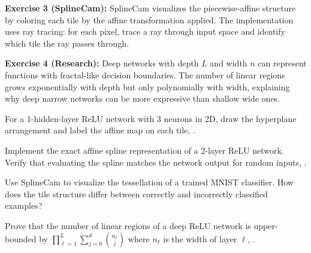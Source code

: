 \begin{solution}
\textbf{Exercise 3 (SplineCam):} SplineCam visualizes the piecewise-affine structure by coloring each tile by the affine transformation applied. The implementation uses ray tracing: for each pixel, trace a ray through input space and identify which tile the ray passes through.
\end{solution}

\begin{solution}
\textbf{Exercise 4 (Research):} Deep networks with depth $L$ and width $n$ can represent functions with fractal-like decision boundaries. The number of linear regions grows exponentially with depth but only polynomially with width, explaining why deep narrow networks can be more expressive than shallow wide ones.
\end{solution}

\label{sec:dl:exercises}

\begin{exercise}
For a 1-hidden-layer ReLU network with 3 neurons in 2D, draw the hyperplane arrangement and label the affine map on each tile, \cite{balestriero2025geometry}.
\end{exercise}

\begin{exercise}
Implement the exact affine spline representation of a 2-layer ReLU network. Verify that evaluating the spline matches the network output for random inputs, \cite{balestriero2025geometry}.
\end{exercise}

\begin{exercise}
Use SplineCam to visualize the tessellation of a trained MNIST classifier. How does the tile structure differ between correctly and incorrectly classified examples?
\end{exercise}

\begin{exercise}[Research]
Prove that the number of linear regions of a deep ReLU network is upper-bounded by $\prod_{\ell=1}^L \sum_{j=0}^d \binom{n_\ell}{j}$ where $n_\ell$ is the width of layer $\ell$, \cite{balestriero2025geometry}.
\end{exercise}
